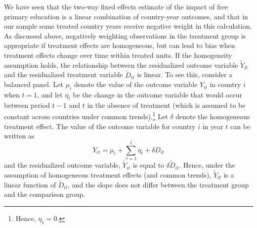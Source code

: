 \documentclass[11pt]{article}
\begin{document}
We have seen that the two-way fixed effects estimate of the impact of free primary education is a linear combination 
of country-year outcomes, and that in our sample some treated country years receive negative weight in this calculation.  
As discussed above, negatively weighting observations in the treatment group is appropriate if treatment effects 
are homogeneous, but can lead to bias when treatment effects change over time within treated units.  If the homogeneity 
assumption holds, the relationship between the residualized outcome variable $\tilde{Y}_{it}$ and the residualized 
treatment variable $\tilde{D}_{it}$ is linear.  To see this, consider a balanced panel.  Let $\mu_i$ denote the value of the outcome 
variable $Y_{it}$ in country $i$ when $t=1$, and let $\eta_t$ be the change in the outcome variable that would occur between 
period $t-1$ and $t$ in the absence of treatment (which is assumed to be constant across countries under common trends).\footnote{Hence, $\eta_1 = 0$.}  Let 
$\delta$ denote the homogeneous treatment effect.  The value of the outcome variable for country $i$ in year $t$ can be written as 
\begin{equation}
Y_{it} = \mu_i + \sum_{\tau = 1}^t \eta_t + \delta D_{it} 
\end{equation}
and the residualized outcome variable, $\tilde{Y}_{it}$ is equal to $\delta \tilde{D}_{it}$.  Hence, under the assumption of homogeneous 
treatment effects (and common trends),  $\tilde{Y}_{it}$ is a linear function of $\tilde{D}_{it}$, and the slope does not differ between the treatment group and 
the comparison group.
\end{document}
